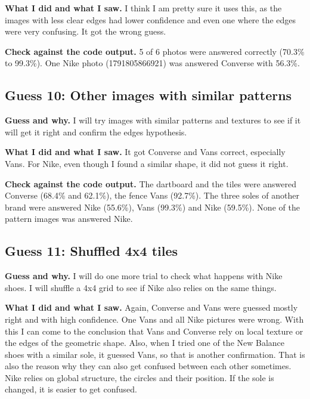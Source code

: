 \documentclass[11pt]{article}
\begin{document}
\textbf{What I did and what I saw.} I think I am pretty sure it uses this, as the images with less clear edges had lower confidence and even one where the edges were very confusing. It got the wrong guess.


\textbf{Check against the code output.} 5 of 6 photos were answered correctly (70.3\% to 99.3\%). One Nike photo (1791805866921) was answered Converse with 56.3\%.

\subsection*{Guess 10: Other images with similar patterns}
\textbf{Guess and why.} I will try images with similar patterns and textures to see if it will get it right and confirm the edges hypothesis.

\textbf{What I did and what I saw.} It got Converse and Vans correct, especially Vans. For Nike, even though I found a similar shape, it did not guess it right.


\textbf{Check against the code output.} The dartboard and the tiles were answered Converse (68.4\% and 62.1\%), the fence Vans (92.7\%). The three soles of another brand were answered Nike (55.6\%), Vans (99.3\%) and Nike (59.5\%). None of the pattern images was answered Nike.

\subsection*{Guess 11: Shuffled 4x4 tiles}
\textbf{Guess and why.} I will do one more trial to check what happens with Nike shoes. I will shuffle a 4x4 grid to see if Nike also relies on the same things.

\textbf{What I did and what I saw.} Again, Converse and Vans were guessed mostly right and with high confidence. One Vans and all Nike pictures were wrong. With this I can come to the conclusion that Vans and Converse rely on local texture or the edges of the geometric shape. Also, when I tried one of the New Balance shoes with a similar sole, it guessed Vans, so that is another confirmation. That is also the reason why they can also get confused between each other sometimes. Nike relies on global structure, the circles and their position. If the sole is changed, it is easier to get confused.

\end{document}
